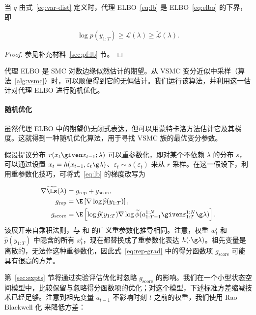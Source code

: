 \begin{theorem}[代理 ELBO]
当 $q$ 由式~\eqref{eq:var-dist} 定义时，代理 ELBO~\eqref{eq:lb} 是 ELBO~\eqref{eq:elbo} 的下界，即

\begin{align*}
\log p(y_{1:T}) \geq \mathcal{L}(\lambda) \geq \widetilde{\mathcal{L}}(\lambda).
\end{align*}
\label{thm:lb}
\end{theorem}
\begin{proof}

参见补充材料~\ref{sec:pf:lb} 节。
\end{proof}
代理 ELBO 是 SMC 对数边缘似然估计的期望。从 VSMC 变分近似中采样（算法~\ref{alg:vsmc}）时，可以顺便得到它的无偏估计。我们运行该算法，并利用这一估计对代理 ELBO 进行随机优化。

\paragraph{随机优化}
虽然代理 ELBO 中的期望仍无闭式表达，但可以用蒙特卡洛方法估计它及其梯度。这就得到一种随机优化算法，用于寻找 VSMC 族的最优变分参数。

假设提议分布 $r(x_t\given x_{t-1};\lambda)$ 可以重参数化，即对某个不依赖 $\lambda$ 的分布 $s$，可以通过设置 $x_t=h(x_{t-1},\varepsilon_t\g\lambda)$、$\varepsilon_t\sim s(\varepsilon_t)$ 来从 $r$ 采样。在这一假设下，利用重参数化技巧\citep{Kingma2014,Rezende2014}，可将式~\eqref{eq:lb} 的梯度改写为

\begin{align}
\nabla \widetilde\Ls(\lambda) &= g_{\text{rep}}+ g_{\text{score}}\label{eq:rep-grad}\\
g_{\text{rep}} &= \E
\left[ \nabla\log \widehat{p}(y_{1:T})  \right], \nonumber\\
g_{\text{score}} &=\E
\left[ \log \widehat{p}(y_{1:T}) \nabla \log 
\widetilde\phi(a_{1:T-1}^{1:N}\given\varepsilon_{1:T}^{1:N}\g\lambda)\right].\nonumber
\end{align}
该展开来自乘积法则，与 \citet{Ruiz2016} 和 \citet{Naesseth2017} 的广义重参数化推导相同。注意，权重 $w_t^i$ 和 $\widehat p(y_{1:T})$ 中隐含的所有 $x_t^i$，现在都替换成了重参数化表达 $h(\cdot\g\lambda)$。祖先变量是离散的，无法作这种重参数化，因此式~\eqref{eq:rep-grad} 中的得分函数项 $g_{\text{score}}$ 可能具有很高的方差。

第~\ref{sec:expts} 节将通过实验评估优化时忽略 $g_{\text{score}}$ 的影响。我们在一个小型状态空间模型中，比较保留与忽略得分函数项的优化；对这个模型，下述标准方差缩减技术已经足够。注意到祖先变量 $a_{t-1}$ 不影响时刻 $t$ 之前的权重，我们使用 Rao–Blackwell 化\citep{Robert2004,Ranganath2014} 来降低方差：

